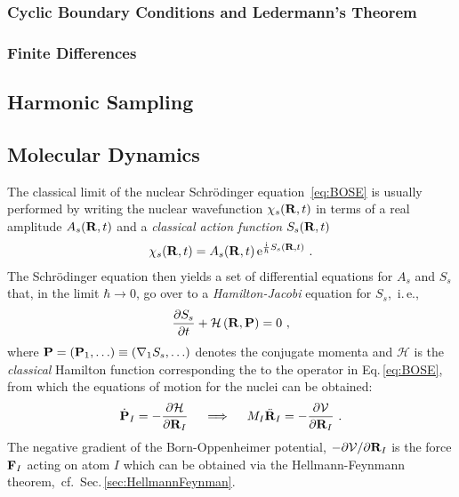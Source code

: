 \subsubsection{Cyclic Boundary Conditions and Ledermann's Theorem}

\subsubsection{Finite Differences}
\subsection{Harmonic Sampling}

\subsection{Molecular Dynamics}
The classical limit of the nuclear Schr\"odinger equation~\eqref{eq:BOSE} is usually performed by writing the nuclear wavefunction $\chi_s ({\bf R}, t)$ in terms of a real amplitude $A_s({\bf R}, t)$ and a \emph{classical action function} $S_s({\bf R}, t)$~\cite{Dirac1981,Landau2013,Marx2009}
\begin{align}
	\chi_s({\bf R}, t) = A_s({\bf R}, t) \, {\rm e}^{\frac{{\rm i}}{\hbar} S_s({\bf R}, t)}~.
	\label{eq:class.1}
\end{align}
The Schr\"odinger equation then yields a set of differential equations for $A_s$ and $S_s$ that, in the limit $\hbar \to 0$, go over to a \emph{Hamilton-Jacobi} equation for $S_s$,~i.\,e.,~
\begin{align}
  \frac{\partial S_s}{\partial t} + \mathcal H \left({\bf R}, {\bf P}\right)
  = 0~,
  \label{eq:HamiltonJacobi}
\end{align}
where ${\bf P} = ({\bf P}_1, \ldots) \equiv ({\bf \nabla}_1 S_s, \ldots)$ denotes the conjugate momenta and $\mathcal H$ is the \emph{classical} Hamilton function corresponding the to the operator in Eq.\,\eqref{eq:BOSE}, from which the equations of motion for the nuclei can be obtained:
\begin{align}
  \dot{{\bf P}}_I 
    = -\frac{\partial \mathcal H}{\partial {\bf R}_I}
    \quad\implies\quad M_I \ddot{\bf R}_I
    = -\frac{\partial \mathcal V}{\partial {\bf R}_I}~.
\end{align}
The negative gradient of the Born-Oppenheimer potential, 
$-\partial \mathcal V / \partial {\bf R}_I$ is the force ${\bf F}_I$ acting on atom $I$ which can be obtained via the Hellmann-Feynmann theorem,~cf.~Sec.\,\ref{sec:HellmannFeynman}.

